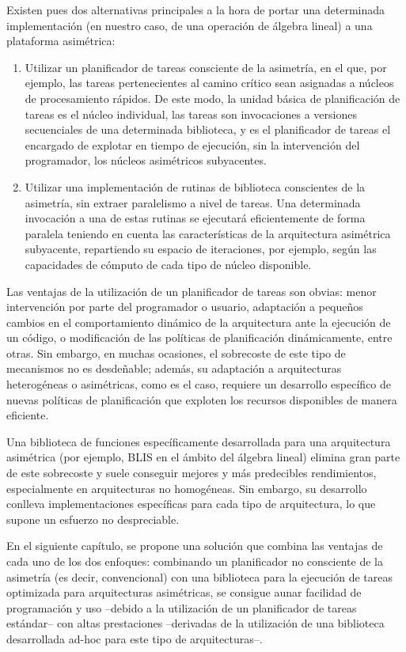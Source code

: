 Existen pues dos alternativas principales a la hora de portar una determinada implementación (en nuestro caso, de una operación
de álgebra lineal) a una plataforma asimétrica:

\begin{enumerate}
 \item Utilizar un planificador de tareas consciente de la asimetría, en el que, por ejemplo, las tareas pertenecientes al camino crítico 
	 sean asignadas a núcleos de procesamiento rápidos. De este modo, la unidad básica de planificación de tareas es el núcleo individual,
		las tareas son invocaciones a versiones secuenciales de una determinada biblioteca, 
		y es el planificador de tareas el encargado de explotar en tiempo de ejecución, sin la intervención del programador, los
		núcleos asimétricos subyacentes.
		
	\item Utilizar una implementación de rutinas de biblioteca conscientes de la asimetría, sin extraer paralelismo a nivel de tareas. Una
		determinada invocación a una de estas rutinas se ejecutará eficientemente de forma paralela teniendo en cuenta las 
		características de la arquitectura asimétrica subyacente, repartiendo su espacio de iteraciones, por ejemplo, según las
		capacidades de cómputo de cada tipo de núcleo disponible.
\end{enumerate}

Las ventajas de la utilización de un planificador de tareas son obvias:
menor intervención por parte del programador o usuario, adaptación a
pequeños cambios en el comportamiento dinámico de la arquitectura ante la
ejecución de un código, o modificación de las políticas de planificación
dinámicamente, entre otras. Sin embargo, en muchas ocasiones, el sobrecoste
de este tipo de mecanismos no es desdeñable; además, su adaptación a
arquitecturas heterogéneas o asimétricas, como es el caso, requiere un
desarrollo específico de nuevas políticas de planificación que exploten los
recursos disponibles de manera eficiente.

Una biblioteca de funciones específicamente desarrollada para una
arquitectura asimétrica (por ejemplo, BLIS en el ámbito del álgebra lineal)
elimina gran parte de este sobrecoste y suele conseguir mejores y más
predecibles rendimientos, especialmente en arquitecturas no homogéneas. Sin
embargo, su desarrollo conlleva implementaciones específicas para cada tipo
de arquitectura, lo que supone un esfuerzo no despreciable.

En el siguiente capítulo, se propone una solución que combina las ventajas
de cada uno de los dos enfoques: combinando un planificador no consciente
de la asimetría (es decir, convencional) con una biblioteca para la
ejecución de tareas optimizada para arquitecturas asimétricas, se consigue
aunar facilidad de programación y uso --debido a la utilización de un
planificador de tareas estándar-- con altas prestaciones --derivadas de la
utilización de una biblioteca desarrollada ad-hoc para este tipo de
arquitecturas--.

